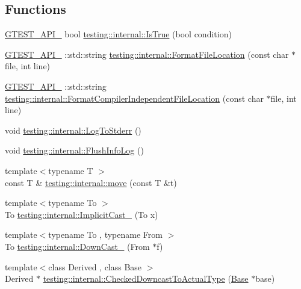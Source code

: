 \subsection*{Functions}
\begin{DoxyCompactItemize}
\item 
\hyperlink{gtest-port_8h_aa73be6f0ba4a7456180a94904ce17790}{G\+T\+E\+S\+T\+\_\+\+A\+P\+I\+\_\+} bool \hyperlink{namespacetesting_1_1internal_a527b9bcc13669b9a16400c8514266254}{testing\+::internal\+::\+Is\+True} (bool condition)
\item 
\hyperlink{gtest-port_8h_aa73be6f0ba4a7456180a94904ce17790}{G\+T\+E\+S\+T\+\_\+\+A\+P\+I\+\_\+} \+::std\+::string \hyperlink{namespacetesting_1_1internal_a31b7c3abed4a7c395f42c61e993989f4}{testing\+::internal\+::\+Format\+File\+Location} (const char $\ast$file, int line)
\item 
\hyperlink{gtest-port_8h_aa73be6f0ba4a7456180a94904ce17790}{G\+T\+E\+S\+T\+\_\+\+A\+P\+I\+\_\+} \+::std\+::string \hyperlink{namespacetesting_1_1internal_a1ee4cde97868c53e442d3182496a9f3c}{testing\+::internal\+::\+Format\+Compiler\+Independent\+File\+Location} (const char $\ast$file, int line)
\item 
void \hyperlink{namespacetesting_1_1internal_a06b1b20029fbd1dbeb59752f914fab84}{testing\+::internal\+::\+Log\+To\+Stderr} ()
\item 
void \hyperlink{namespacetesting_1_1internal_a2135f223bf6b527729aeaa651115183b}{testing\+::internal\+::\+Flush\+Info\+Log} ()
\item 
{\footnotesize template$<$typename T $>$ }\\const T \& \hyperlink{namespacetesting_1_1internal_a0f6d06bf8c3093b9c22bb08723db201e}{testing\+::internal\+::move} (const T \&t)
\item 
{\footnotesize template$<$typename To $>$ }\\To \hyperlink{namespacetesting_1_1internal_a982df3f369643b175f79cda4048bc3b9}{testing\+::internal\+::\+Implicit\+Cast\+\_\+} (To x)
\item 
{\footnotesize template$<$typename To , typename From $>$ }\\To \hyperlink{namespacetesting_1_1internal_a1a1a1aed3fe00908b8a45d5ab4a33665}{testing\+::internal\+::\+Down\+Cast\+\_\+} (From $\ast$f)
\item 
{\footnotesize template$<$class Derived , class Base $>$ }\\Derived $\ast$ \hyperlink{namespacetesting_1_1internal_abfe9bfb020d38aa4e0e12c001911b22b}{testing\+::internal\+::\+Checked\+Downcast\+To\+Actual\+Type} (\hyperlink{class_base}{Base} $\ast$base)

\end{DoxyCompactItemize}

